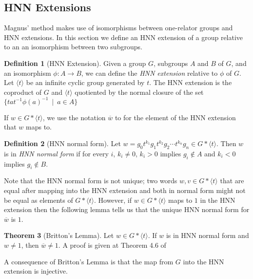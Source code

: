 \documentclass[12pt]{article} %
\theoremstyle{definition}
\newtheorem{thm}{Theorem}[subsubsection]
\theoremstyle{definition}
\theoremstyle{definition}
\theoremstyle{definition}
\newtheorem{defn}[thm]{Definition}
\begin{document}
\subsection{HNN Extensions}\label{HNN}

Magnus' method makes use of isomorphisms between one-relator groups and HNN extensions.
In this section we define an HNN extension of a group relative to an
an isomorphism between two subgroups.

\begin{defn}[HNN Extension]
  Given a group $G$, subgroups $A$ and $B$ of $G$, and an isomorphism $\phi: A \to B$, we can define
  the \textit{HNN extension} relative to $\phi$ of $G$. Let $\langle t \rangle$ be an infinite cyclic
  group generated by $t$. The HNN extension is the coproduct
  of $G$ and $\langle t \rangle$ quotiented
  by the normal closure of the set $\{ta t^{-1} \phi(a)^{-1} \ \mid \ a \in A\}$
\end{defn}

If $w \in G \ast \langle t \rangle$, we use the notation $\overline{w}$ to
for the element of the HNN extension that $w$ maps to.

\begin{defn}[HNN normal form]\label{HNNnormalform}
  Let $w = g_0t^{k_1}g_1t^{k_2}g_2 \cdots t^{k_n}g_n \in G \ast \langle t \rangle$.
  Then $w$ is in \textit{HNN normal form} if for every $i$, $k_i \ne 0$, $k_i > 0$
  implies $g_i \notin A$ and $k_i < 0$ implies $g_i \notin B$.
\end{defn}

Note that the HNN normal form is not unique; two words $w, v \in G \ast \langle t \rangle$
that are equal after mapping into the HNN extension and both in normal form might not be
equal as elements of $G \ast \langle t \rangle$. However, if $w \in G \ast \langle t \rangle $
maps to $1$ in the HNN extension
then the following lemma tells us that the unique HNN normal form for $\overline{w}$ is $1$.

\begin{thm}[Britton's Lemma]\label{britton}
  Let $w \in G \ast \langle t \rangle$.
  If $w$ is in HNN normal form and $w \ne 1$, then
  $\overline{w} \ne 1$. A proof is given at Theorem 4.6 of \cite{infinitegroups}
\end{thm}

A consequence of Britton's Lemma is that the map from $G$ into the HNN extension
is injective.
\end{document}
